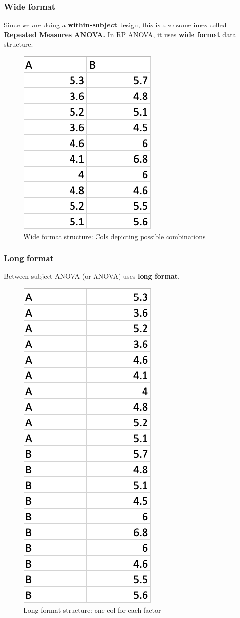 \documentclass{beamer}
\begin{document}
\begin{frame}
	\frametitle{Wide format}
	Since we are doing a \textbf{within-subject }design, this is also sometimes called \textbf{Repeated Measures ANOVA.}   In RP ANOVA,  it uses \textbf{wide format} data structure.
	\begin{figure}
		\includegraphics[width=0.2\linewidth]{wide-format}
		\caption{Wide format structure:  Cols depicting possible combinations}
	\end{figure}
\end{frame}

\begin{frame}
	\frametitle{Long format}
	Between-subject ANOVA (or ANOVA) uses \textbf{long format}.
	\begin{figure}
		\includegraphics[width=0.2\linewidth]{long-format}
		\caption{Long format structure:  one col for each factor}
	\end{figure}
\end{frame}
\end{document}
